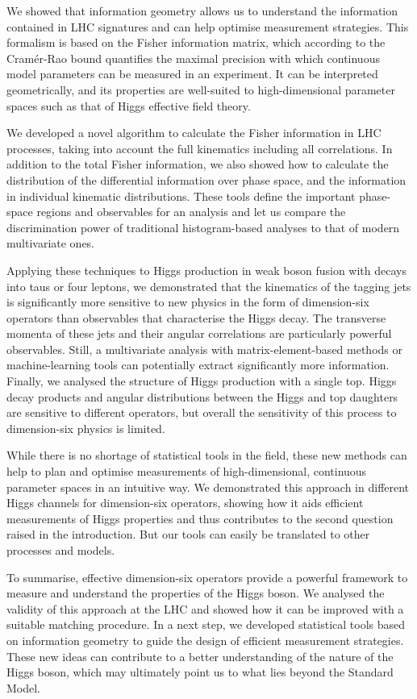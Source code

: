 We showed that information geometry allows us to understand the
information contained in LHC signatures and can help optimise
measurement strategies. This formalism is based on the Fisher
information matrix, which according to the Cram\'er-Rao bound
quantifies the maximal precision with which continuous model
parameters can be measured in an experiment. It can be interpreted
geometrically, and its properties are well-suited to high-dimensional
parameter spaces such as that of Higgs effective field theory.

We developed a novel algorithm to calculate the Fisher information in
LHC processes, taking into account the full kinematics including all
correlations. In addition to the total Fisher information, we also
showed how to calculate the distribution of the differential
information over phase space, and the information in individual
kinematic distributions. These tools define the important phase-space
regions and observables for an analysis and let us compare the
discrimination power of traditional histogram-based analyses to that
of modern multivariate ones.

Applying these techniques to Higgs production in weak boson fusion
with decays into taus or four leptons, we demonstrated that the
kinematics of the tagging jets is significantly more sensitive to new
physics in the form of dimension-six operators than observables that
characterise the Higgs decay.  The transverse momenta of these jets
and their angular correlations are particularly powerful
observables. Still, a multivariate analysis with matrix-element-based
methods or machine-learning tools can potentially extract
significantly more information. Finally, we analysed the structure of
Higgs production with a single top. Higgs decay products and angular
distributions between the Higgs and top daughters are sensitive to
different operators, but overall the sensitivity of this process to
dimension-six physics is limited.

%
While there is no shortage of statistical tools in the field, these
new methods can help to plan and optimise measurements of
high-dimensional, continuous parameter spaces in an intuitive way.  We
demonstrated this approach in different Higgs channels for
dimension-six operators, showing how it aids efficient measurements of
Higgs properties and thus contributes to the second question raised in
the introduction. But our tools can easily be translated to other
processes and models.

\newparagraph
%
To summarise, effective dimension-six operators provide a powerful
framework to measure and understand the properties of the Higgs
boson. We analysed the validity of this approach at the LHC and showed
how it can be improved with a suitable matching procedure. In a next
step, we developed statistical tools based on information geometry to
guide the design of efficient measurement strategies. These new ideas
can contribute to a better understanding of the nature of the Higgs
boson, which may ultimately point us to what lies beyond the Standard
Model.
